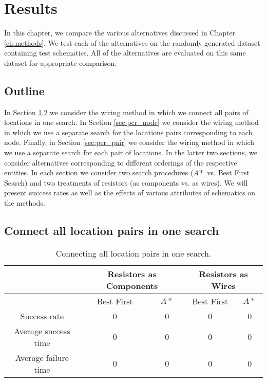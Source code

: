 
\chapter{Results}
\label{ch:results}

In this chapter, we compare the various alternatives discussed in Chapter
\ref{ch:methods}. We test each of the alternatives on the randomly generated
dataset containing \q test schematics. All of the alternatives are evaluated on
this same dataset for appropriate comparison.

\section{Outline}

In Section \ref{sec:all_pairs} we consider the wiring method in which we connect
all pairs of locations in one search. In Section \ref{sec:per_node} we consider
the wiring method in which we use a separate search for the locations pairs
corresponding to each node. Finally, in Section \ref{sec:per_pair} we consider
the wiring method in which we use a separate search for each pair of locations.
In the latter two sections, we consider alternatives corresponding to different
orderings of the respective entities. In each section we consider two search
procedures ($A*$ vs. Best First Search) and two treatments of resistors (as
components vs. as wires). We will present success rates as well as the effects
of various attributes of schematics on the methods.

\section{Connect all location pairs in one search}
\label{sec:all_pairs}

\begin{table}[H]
\begin{center}
\begin{singlespace}
\begin{tabular}{| c || c | c | c | c |}
\hline
 & \multicolumn{2}{|c|}{Resistors as Components} & \multicolumn{2}{|c|}{
 Resistors as Wires} \\
\hline
 & Best First & $A*$ & Best First & $A*$ \\
\hline\hline
Success rate & 0 & 0 & 0 & 0 \\
Average success time & 0 & 0 & 0 & 0 \\
Average failure time & 0 & 0 & 0 & 0 \\
\hline
\end{tabular}
\end{singlespace}
\end{center}
\caption{Connecting all location pairs in one search.}
\end{table}

